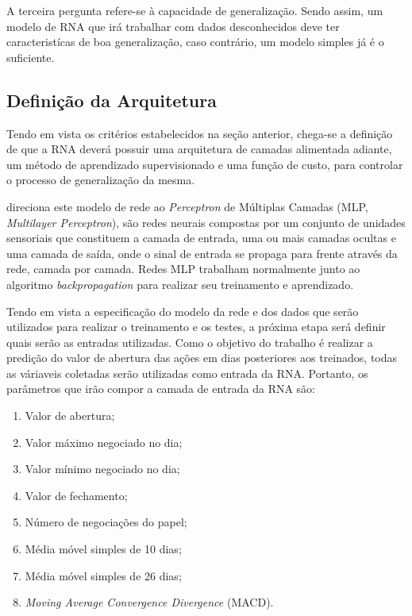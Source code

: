 A terceira pergunta refere-se à capacidade de generalização. Sendo assim, um modelo de RNA que irá trabalhar com dados desconhecidos deve ter caracteristícas de boa generalização, caso contrário, um modelo simples já é o suficiente.

\subsection{Definição da Arquitetura}

Tendo em vista os critérios estabelecidos na seção anterior, chega-se a definição de que a RNA deverá possuir uma arquitetura de camadas alimentada adiante, um método de aprendizado supervisionado e uma função de custo, para controlar o processo de generalização da mesma.

 direciona este modelo de rede ao \textit{Perceptron} de Múltiplas Camadas (MLP, \textit{Multilayer Perceptron}), são redes neurais compostas por um conjunto de unidades sensoriais que constituem a camada de entrada, uma ou mais camadas ocultas e uma camada de saída, onde o sinal de entrada se propaga para frente através da rede, camada por camada. Redes MLP trabalham normalmente junto ao algoritmo \textit{backpropagation} para realizar seu treinamento e aprendizado.

Tendo em vista a especificação do modelo da rede e dos dados que serão utilizados para realizar o treinamento e os testes, a próxima etapa será definir quais serão as entradas utilizadas. Como o objetivo do trabalho é realizar a predição do valor de abertura das ações em dias posteriores aos treinados, todas as váriaveis coletadas serão utilizadas como entrada da RNA. Portanto, os parâmetros que irão compor a camada de entrada da RNA são:

\begin{enumerate}
\item Valor de abertura;
\item Valor máximo negociado no dia;
\item Valor mínimo negociado no dia;
\item Valor de fechamento;
\item Número de negociações do papel;
\item Média móvel simples de 10 dias;
\item Média móvel simples de 26 dias;
\item \textit{Moving Average Convergence Divergence} (MACD).
\end{enumerate}

